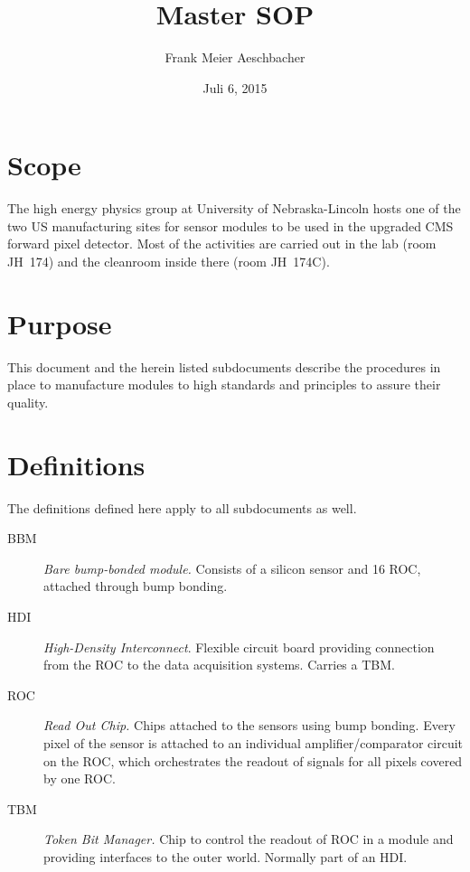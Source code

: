 \documentclass[12pt]{unlsilabsop}
\title{Master SOP}
\date{Juli 6, 2015}
\author{Frank Meier Aeschbacher}
\begin{document}
\maketitle

\section{Scope}
The high energy physics group at University of Nebraska-Lincoln hosts one of the two US manufacturing sites for sensor modules to be used in the upgraded CMS forward pixel detector. Most of the activities are carried out in the lab (room JH~174) and the cleanroom inside there (room JH~174C).

\section{Purpose}
This document and the herein listed subdocuments describe the procedures in place to manufacture modules to high standards and principles to assure their quality.

\section{Definitions}
The definitions defined here apply to all subdocuments as well.
\begin{description}
    \item[BBM] \emph{Bare bump-bonded module.} Consists of a silicon sensor and 16 ROC, attached through bump bonding.
    \item[HDI] \emph{High-Density Interconnect}. Flexible circuit board providing connection from the ROC to the data acquisition systems. Carries a TBM.
    \item[ROC] \emph{Read Out Chip.} Chips attached to the sensors using bump bonding. Every pixel of the sensor is attached to an individual amplifier/comparator circuit on the ROC, which orchestrates the readout of signals for all pixels covered by one ROC.
    \item[TBM] \emph{Token Bit Manager.} Chip to control the readout of ROC in a module and providing interfaces to the outer world. Normally part of an HDI.
\end{description}

\end{document}
